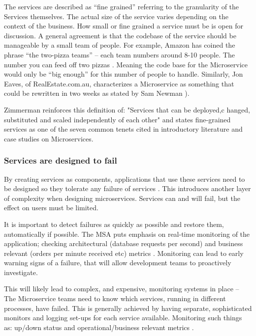 The services are described as “fine grained” referring to the granularity of the Services themselves. The actual size of the service varies depending on the context of the business. How small or fine grained a service must be is open for discussion. A general agreement is that the codebase of the service should be manageable by a small team of people.  For example, Amazon \cite{HoffAmazonArchi} has coined the phrase “the two-pizza teams” – each team numbers around 8-10 people. The number you can feed off two pizzas . Meaning the code base for the Microservice would only be “big enough” for this number of people to handle. Similarly, Jon Eaves, of RealEstate.com.au, characterizes a Microservice as something that could be rewritten in two weeks as stated by Sam Newman \cite{NewmanMSA}).

Zimmerman \cite{Zimmermann2017} reinforces this definition of: "Services that can be deployed,c hanged, substituted and scaled independently of each other" and states fine-grained services as one of the seven common tenets cited in introductory literature and case studies on Microservices.

\subsubsection{Services are designed to fail}
By creating services as components, applications that use these services need to be designed so they tolerate any failure of services \cite{MartinFowlersite}. This introduces another layer of complexity when designing microservices. Services can and will fail, but the effect on users must be limited.

It is important to detect failures as quickly as possible and restore them, automatically if possible. The MSA puts emphasis on real-time monitoring of the application; checking architectural (database requests per second) and business relevant (orders per minute received etc) metrics \cite{MartinFowlersite}. Monitoring can lead to early warning signs of a failure, that will allow development teams to proactively investigate.

This will likely lead to complex, and expensive, monitoring systems in place – The Microservice teams need to know which services, running in different processes, have failed. This is generally achieved by having separate, sophisticated monitors and logging set-ups for each service available. Monitoring such things as: up/down status and operational/business relevant metrics \cite{MartinFowlersite}.

